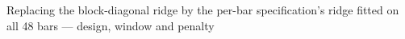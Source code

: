 Replacing the block-diagonal ridge by the per-bar
specification's ridge fitted on all 48 bars --- design, window and penalty
